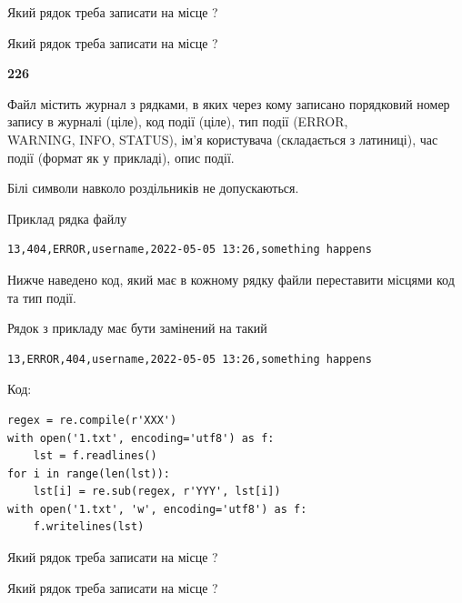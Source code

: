 Який рядок треба записати на місце  ?\par
\vspace{5mm}


Який рядок треба записати на місце  ?\par


\newpage

{\begin {center}\textbf{ 226}\end {center}}\par
Файл  містить журнал з рядками, в яких через кому записано поряд\-ко\-вий номер запису в журналі (ціле), код події (ціле), тип події (ERROR,\\ WARNING, INFO, STATUS), ім'я користувача (складається з латиниці), час події (фор\-мат як у прикладі), опис події.

Білі символи навколо роздільників не допускаються.

Приклад рядка файлу



\begin{verbatim}
13,404,ERROR,username,2022-05-05 13:26,something happens
\end{verbatim}


Нижче наведено код, який має в кожному рядку файли переставити місцями код та тип події.

Рядок з прикладу має бути замінений на такий



\begin{verbatim}
13,ERROR,404,username,2022-05-05 13:26,something happens
\end{verbatim}




Код:



\begin{verbatim}
regex = re.compile(r'XXX')
with open('1.txt', encoding='utf8') as f:
    lst = f.readlines()
for i in range(len(lst)):
    lst[i] = re.sub(regex, r'YYY', lst[i])
with open('1.txt', 'w', encoding='utf8') as f:
    f.writelines(lst)
\end{verbatim}







Який рядок треба записати на місце  ?\par
\vspace{5mm}


Який рядок треба записати на місце  ?\par


